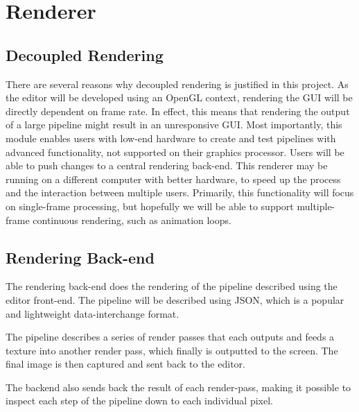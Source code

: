 
\chapter{Renderer}

\section{Decoupled Rendering}
There are several reasons why decoupled rendering is justified in this project. As the editor will be developed using an OpenGL context, rendering the GUI will be directly dependent on frame rate. In effect, this means that rendering the output of a large pipeline might result in an unresponsive GUI.
Most importantly, this module enables users with low-end hardware to create and test pipelines with advanced functionality, not supported on their graphics processor. Users will be able to push changes to a central rendering back-end. This renderer may be running on a different computer with better hardware, to speed up the process and the interaction between multiple users.  Primarily, this functionality will focus on single-frame processing, but hopefully we will be able to support multiple-frame continuous rendering, such as animation loops. 

\section{Rendering Back-end}
The rendering back-end does the rendering of the pipeline described using the editor front-end. The pipeline will be described using JSON, which is a popular and lightweight data-interchange format.

The pipeline describes a series of render passes that each outputs and feeds a texture into another render pass, which finally is outputted to the screen. The final image is then captured and sent back to the editor.

The backend also sends back the result of each render-pass, making it possible to inspect each step of the pipeline down to each individual pixel.